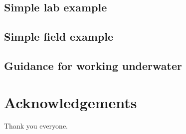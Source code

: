 \documentclass[fleqn,10pt]{wlpeerj}
\begin{document}
\subsection*{Simple lab example}

\subsection*{Simple field example}

\subsection*{Guidance for working underwater}

\section*{Acknowledgements}
Thank you everyone.


\end{document}
